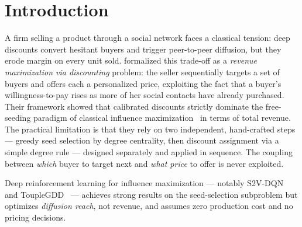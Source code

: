 %
%

\section{Introduction}
\label{sec:intro}

A firm selling a product through a social network faces a classical tension:
deep discounts convert hesitant buyers and trigger peer-to-peer
diffusion,  but they erode margin on every unit sold.
\citet{babaei2013revenue} formalized this trade-off as a
\emph{revenue maximization via discounting} problem: the seller sequentially
targets a set of buyers and offers each a personalized price, exploiting the
fact that a buyer's willingness-to-pay rises as more of her social contacts
have already purchased.
Their framework showed that calibrated discounts strictly dominate the
free-seeding paradigm of classical influence maximization~\citep{kempe2003maximizing}
in terms of total revenue.
The practical limitation is that they rely on two independent, hand-crafted
steps — greedy seed selection by degree centrality, then discount assignment via a
simple degree rule — designed separately and applied in sequence.
The coupling between \emph{which} buyer to target next and
\emph{what price} to offer is never exploited.

Deep reinforcement learning for influence maximization — notably
S2V-DQN~\citep{dai2017learning} and ToupleGDD~\citep{touplegdd} — achieves
strong results on the seed-selection subproblem but optimizes
\emph{diffusion reach}, not revenue, and assumes zero production cost and no pricing
decisions.

